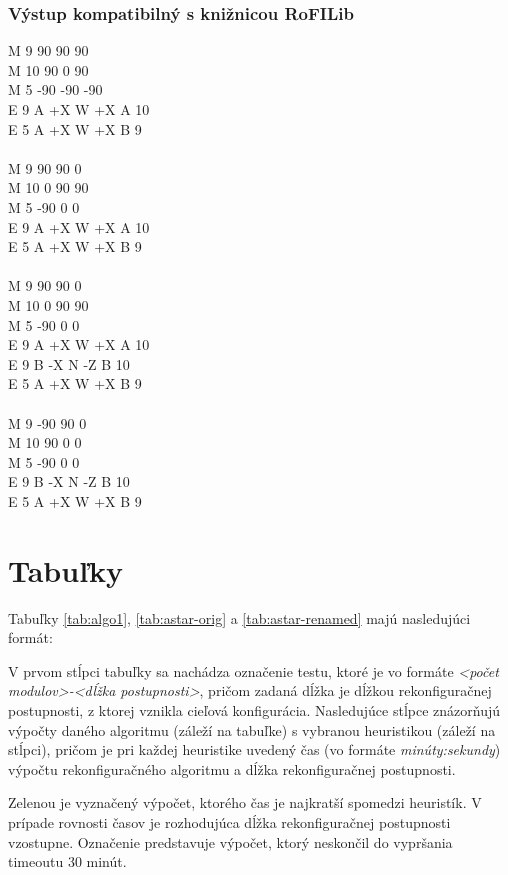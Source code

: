 \documentclass[
  printed, %
  oneside, %
  notable,   %
  nolof,     %
  nolot,     %
]{fithesis3}
\begin{document}
\subsection{Výstup kompatibilný s knižnicou RoFILib}
M 9 90 90 90 \\
M 10 90 0 90 \\
M 5 -90 -90 -90 \\
E 9 A +X W +X A 10 \\
E 5 A +X W +X B 9 \\
\\
M 9 90 90 0 \\
M 10 0 90 90 \\
M 5 -90 0 0 \\
E 9 A +X W +X A 10 \\
E 5 A +X W +X B 9 \\
\\
M 9 90 90 0 \\
M 10 0 90 90 \\
M 5 -90 0 0 \\
E 9 A +X W +X A 10 \\
E 9 B -X N -Z B 10 \\
E 5 A +X W +X B 9 \\
\\
M 9 -90 90 0 \\
M 10 90 0 0 \\
M 5 -90 0 0 \\
E 9 B -X N -Z B 10 \\
E 5 A +X W +X B 9

\chapter{Tabuľky}
\label{tab:tables}

Tabuľky \ref{tab:algo1}, \ref{tab:astar-orig} a \ref{tab:astar-renamed} majú nasledujúci formát: 

V prvom stĺpci tabuľky sa nachádza označenie testu, ktoré je vo formáte \textit{<počet modulov>-<dĺžka postupnosti>}, pričom zadaná dĺžka je dĺžkou rekonfiguračnej postupnosti, z ktorej vznikla cieľová konfigurácia. Nasledujúce stĺpce znázorňujú výpočty daného algoritmu (záleží na tabuľke) s vybranou heuristikou (záleží na stĺpci), pričom je pri každej heuristike uvedený čas (vo formáte \textit{minúty:sekundy}) výpočtu rekonfiguračného algoritmu a dĺžka rekonfiguračnej postupnosti. 

\colorbox{table-green}{Zelenou} je vyznačený výpočet, ktorého čas je najkratší spomedzi heuristík. V prípade rovnosti časov je rozhodujúca dĺžka rekonfiguračnej postupnosti vzostupne. Označenie \uv{--} predstavuje výpočet, ktorý neskončil do vypršania timeoutu 30 minút. 
\end{document}
